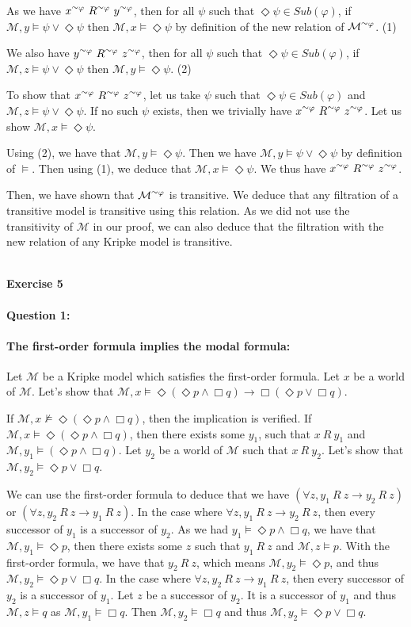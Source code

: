 \documentclass[10pt]{article}
\def\exercise#1{\ \vspace{1cm}\\\Large\textbf{Exercise #1}\normalsize\\}
\def\question#1{\ \vspace{1cm}\\\textbf{Question #1:}\quad}
\def\tilde{\raise.17ex\hbox{$\scriptstyle\sim$}}
\def\M{\mathcal{M}}
\def\tphi{^{\tilde\varphi}}
\begin{document}
As we have $x\tphi\ R\tphi\ y\tphi$, then for all $\psi$ such that $\Diamond\psi\in\mathit{Sub}(\varphi)$, if $\M,y\models\psi\vee\Diamond\psi$ then $\M,x\models\Diamond\psi$ by definition of the new relation of $\M\tphi$. (1)

We also have $y\tphi\ R\tphi\ z\tphi$, then for all $\psi$ such that $\Diamond\psi\in\mathit{Sub}(\varphi)$, if $\M,z\models\psi\vee\Diamond\psi$ then $\M,y\models\Diamond\psi$. (2)

To show that $x\tphi\ R\tphi\ z\tphi$, let us take $\psi$ such that $\Diamond\psi\in\mathit{Sub}(\varphi)$ and $\M,z\models\psi\vee\Diamond\psi$. If no such $\psi$ exists, then we trivially have $x\tphi\ R\tphi\ z\tphi$. Let us show $\M,x\models\Diamond\psi$.

Using (2), we have that $\M,y\models\Diamond\psi$. Then we have $\M,y\models\psi\vee\Diamond\psi$ by definition of $\models$. Then using (1), we deduce that $\M,x\models\Diamond\psi$. We thus have $x\tphi\ R\tphi\ z\tphi$.

Then, we have shown that $\M\tphi$ is transitive. We deduce that any filtration of a transitive model is transitive using this relation. As we did not use the transitivity of $\M$ in our proof, we can also deduce that the filtration with the new relation of any Kripke model is transitive.

\exercise{5}
\question{1}
\paragraph{The first-order formula implies the modal formula:}
Let $\M$ be a Kripke model which satisfies the first-order formula. Let $x$ be a world of $\M$. Let's show that $\M,x\models\Diamond(\Diamond p\wedge\Box q)\rightarrow\Box(\Diamond p\vee\Box q)$.

If $\M,x\not\models\Diamond(\Diamond p\wedge\Box q)$, then the implication is verified. If $\M,x\models\Diamond(\Diamond p\wedge\Box q)$, then there exists some $y_1$, such that $x\ R\ y_1$ and $\M,y_1\models(\Diamond p\wedge\Box q)$. Let $y_2$ be a world of $\M$ such that $x\ R\ y_2$. Let's show that $\M,y_2\models\Diamond p\vee\Box q$.

We can use the first-order formula to deduce that we have $(\forall z,y_1\ R\ z\rightarrow y_2\ R\ z)$ or $(\forall z,y_2\ R\ z\rightarrow y_1\ R\ z)$.
In the case where $\forall z,y_1\ R\ z\rightarrow y_2\ R\ z$, then every successor of $y_1$ is a successor of $y_2$. As we had $y_1\models\Diamond p\wedge\Box q$, we have that $\M,y_1\models\Diamond p$, then there exists some $z$ such that $y_1\ R\ z$ and $\M,z\models p$. With the first-order formula, we have that $y_2\ R\ z$, which means $\M,y_2\models\Diamond p$, and thus $\M,y_2\models\Diamond p\vee\Box q$.
In the case where $\forall z,y_2\ R\ z\rightarrow y_1\ R\ z$, then every successor of $y_2$ is a successor of $y_1$. Let $z$ be a successor of $y_2$. It is a successor of $y_1$ and thus $\M,z\models q$ as $\M,y_1\models\Box q$. Then $\M,y_2\models\Box q$ and thus $\M,y_2\models\Diamond p\vee\Box q$.
\end{document}
